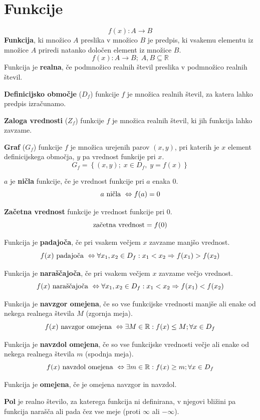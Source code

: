 \documentclass[a4paper,oneside,12pt,fleqn]{article}
\def\R{\ensuremath{\mathbb R}}
\renewcommand\implies\Rightarrow
\renewcommand\iff\Leftrightarrow
\numberwithin{equation}{section}
\begin{document}
\section{Funkcije}
\label{sec:fun}
\[ f(x)\!: A \rightarrow B \]
\textbf{Funkcija}, ki množico $A$ preslika v množico $B$ je predpis, ki vsakemu elementu iz množice
$A$ priredi natanko določen element iz množice $B$.
\[ f(x)\!: A \rightarrow B; \; A, B \subseteq \R \]
Funkcija je \textbf{realna}, če podmnožico realnih števil preslika v podmnožico realnih števil.

\textbf{Definicijsko območje} ($D_f$) funkcije $f$ je množica realnih števil, za katera lahko
predpis izračunamo.

\textbf{Zaloga vrednosti} ($Z_f$) funkcije $f$ je množica realnih števil, ki jih funkcija lahko
zavzame.

\textbf{Graf} ($G_f$) funkcije $f$ je množica urejenih parov $(x, y)$, pri katerih je $x$ element
definicijskega območja, $y$ pa vrednost funkcije pri $x$.
\[ G_f = \left\{ (x,y); \; x \in D_f, \; y = f(x) \right\} \]

$a$ je \textbf{ničla} funkcije, če je vrednost funkcije pri $a$ enaka 0.
\[ a \textnormal{ ničla } \iff f(a) = 0 \]

\textbf{Začetna vrednost} funkcije je vrednost funkcije pri 0.
\[ \textnormal{začetna vrednost} = f(0) \]

Funkcija je \textbf{padajoča}, če pri vsakem večjem $x$ zavzame manjšo vrednost.
\[ f(x) \textnormal{ padajoča } \iff \forall x_1, x_2 \in D_f: x_1 < x_2 \implies f(x_1) >
f(x_2) \]

Funkcija je \textbf{naraščajoča}, če pri vsakem večjem $x$ zavzame večjo vrednost.
\[ f(x) \textnormal{ naraščajoča } \iff \forall x_1, x_2 \in D_f: x_1 < x_2 \implies f(x_1) <
f(x_2) \]

Funkcija je \textbf{navzgor omejena}, če so vse funkcijske vrednosti manjše ali enake od nekega
realnega števila $M$ (zgornja meja).
\[ f(x) \textnormal{ navzgor omejena } \iff \exists M \in \R: f(x) \leq M; \forall x \in D_f \]


Funkcija je \textbf{navzdol omejena}, če so vse funkcijske vrednosti večje ali enake od nekega
realnega števila $m$ (spodnja meja).
\[ f(x) \textnormal{ navzdol omejena } \iff \exists m \in \R: f(x) \geq m; \forall x \in D_f \]

Funkcija je \textbf{omejena}, če je omejena navzgor in navzdol.

\textbf{Pol} je realno število, za katerega funkcija ni definirana, v njegovi bližini pa funkcija
narašča ali pada čez vse meje (proti $\infty$ ali $-\infty$). 
\end{document}
